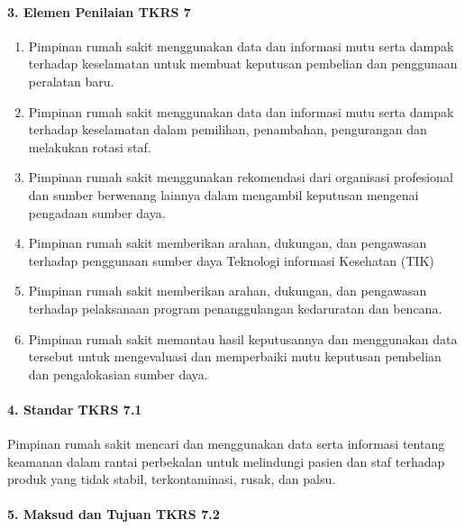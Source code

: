 \documentclass[
]{book}
\providecommand{\tightlist}{%
  \setlength{\itemsep}{0pt}\setlength{\parskip}{0pt}}
\begin{document}
\hypertarget{elemen-penilaian-tkrs-7}{%
\paragraph*{3. Elemen Penilaian TKRS 7}\label{elemen-penilaian-tkrs-7}}

\begin{enumerate}
\def\labelenumi{\alph{enumi}.}
\tightlist
\item
  Pimpinan rumah sakit menggunakan data dan informasi mutu serta dampak terhadap keselamatan untuk membuat keputusan pembelian dan penggunaan peralatan baru.
\item
  Pimpinan rumah sakit menggunakan data dan informasi mutu serta dampak terhadap keselamatan dalam pemilihan, penambahan, pengurangan dan melakukan rotasi staf.
\item
  Pimpinan rumah sakit menggunakan rekomendasi dari organisasi profesional dan sumber berwenang lainnya dalam mengambil keputusan mengenai pengadaan sumber daya.
\item
  Pimpinan rumah sakit memberikan arahan, dukungan, dan pengawasan terhadap penggunaan sumber daya Teknologi informasi Kesehatan (TIK)
\item
  Pimpinan rumah sakit memberikan arahan, dukungan, dan pengawasan terhadap pelaksanaan program penanggulangan kedaruratan dan bencana.
\item
  Pimpinan rumah sakit memantau hasil keputusannya dan menggunakan data tersebut untuk mengevaluasi dan memperbaiki mutu keputusan pembelian dan pengalokasian sumber daya.
\end{enumerate}

\hypertarget{standar-tkrs-7.1}{%
\paragraph*{4. Standar TKRS 7.1}\label{standar-tkrs-7.1}}

Pimpinan rumah sakit mencari dan menggunakan data serta informasi tentang keamanan dalam rantai perbekalan untuk melindungi pasien dan staf terhadap produk yang tidak stabil, terkontaminasi, rusak, dan palsu.

\hypertarget{maksud-dan-tujuan-tkrs-7.2}{%
\paragraph*{5. Maksud dan Tujuan TKRS 7.2}\label{maksud-dan-tujuan-tkrs-7.2}}
\end{document}
